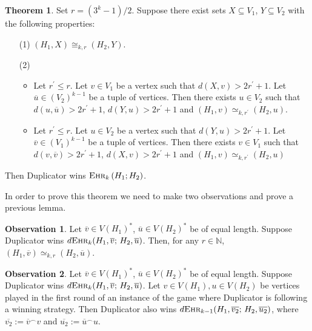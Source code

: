 \documentclass[12pt,notitlepage,a4paper]{article}
\theoremstyle{definition}
\newtheorem{theorem}{Theorem}[section]
\newtheorem{obs}{Observation}[section]
\newcommand{\N}{\mathbb{N}}
\newcommand{\ehr}{\textsc{Ehr}}
\begin{document}
\begin{theorem}\label{thm:DuplicatorAux}
	Set $r=(3^k-1)/2$.
	Suppose there exist
	sets $X\subseteq V_1$, $Y\subseteq V_2$ with the 
	following properties:
	\begin{enumerate}
		\item[(1)] $(H_1,X)\cong_{k,r} (H_2,Y)$.
		\item[(2)]
		\begin{itemize}
			\item Let $r^\prime\leq r$. Let $v\in V_1$ be
			a vertex such that $d(X,v)> 2r^\prime + 1$. Let 
			$\overline{u}\in (V_2)^{k-1}$ be a tuple of vertices. 
			Then there exists $u\in V_2$ such that 
			$d(u,\overline{u})>2r^\prime+1$,
			$d(Y,u)>2r^\prime +1$ and
			$(H_1,v)\simeq_{k,r^\prime} (H_2,u)$.	
			\item Let $r^\prime\leq r$. Let $u\in V_2$ be
			a vertex such that $d(Y,u)> 2r^\prime + 1$. Let 
			$\overline{v}\in (V_1)^{k-1}$ be a tuple of vertices. 
			Then there exists $v\in V_1$ such that 
			$d(v,\overline{v})>2r^\prime+1$,
			$d(X,v)>2r^\prime +1$ and
			$(H_1,v)\simeq_{k,r^\prime} (H_2,u)$
		\end{itemize}
	\end{enumerate}
	Then Duplicator wins $\ehr_k\left(H_1;H_2\right)$.
\end{theorem}

In order to prove this theorem we need to make two observations
and prove a previous lemma. 

\begin{obs} \label{obs1}
	Let
	$\overline{v}\in V(H_1)^*$, $\overline{u}\in V(H_2)^*$ be of equal length. Suppose
	Duplicator wins $d\ehr_k(H_1,\overline{v}; \, H_2,\overline{u})$.
	Then, for any $r\in \N$, $(H_1, \overline{v})\simeq_{k,r} 
	(H_2,\overline{u})$. 
\end{obs}



\begin{obs} \label{obs2}
	Let
	$\overline{v}\in V(H_1)^*$, $\overline{u}\in V(H_2)^*$ be of equal length. Suppose 
	Duplicator wins $d\ehr_k(H_1,\overline{v};\,H_2,\overline{u})$. 
	Let $v\in V(H_1),u\in V(H_2)$ be vertices
	played in the first round of an instance of the game 
	where Duplicator is following a winning strategy. Then 
	Duplicator also wins $d\ehr_{k-1}(H_1,\overline{v_2}; \,
	H_2,\overline{u_2})$, where $\overline{v_2}:=\overline{v}^\smallfrown v$
	and $\overline{u_2}:=\overline{u}^\smallfrown u$.
\end{obs}
\end{document}
